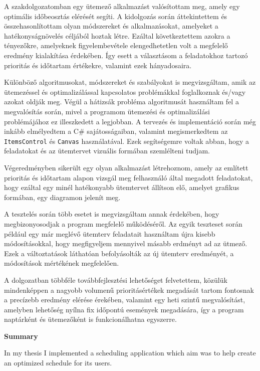 
A szakdolgozatomban egy ütemező alkalmazást valósítottam meg, amely egy optimális időbeosztás elérését segíti. A kidolgozás során áttekintettem és összehasonlítottam olyan módszereket és alkalmazásokat, amelyeket a hatékonyságnövelés céljából hoztak létre. Ezáltal következtettem azokra a tényezőkre, amelyeknek figyelembevétele elengedhetetlen volt a megfelelő eredmény kialakítása érdekében. Így esett a választásom a feladatokhoz tartozó prioritás és időtartam értékekre, valamint ezek hányadosaira.

Különböző algoritmusokat, módszereket és szabályokat is megvizsgáltam, amik az ütemezéssel és optimalizálással kapcsolatos problémákkal foglalkoznak és/vagy azokat oldják meg. Végül a hátizsák probléma algoritmusát használtam fel a megvalósítás során, mivel a programom ütemezési és optimalizálási problémájához ez illeszkedett a legjobban.
A tervezés és implementáció során még inkább elmélyedtem a C\# sajátosságaiban, valamint megismerkedtem az \texttt{ItemsControl} és \texttt{Canvas} használatával. Ezek segítségemre voltak abban, hogy a feladatokat és az ütemtervet vizuális formában szemlélteni tudjam.

Végeredményben sikerült egy olyan alkalmazást létrehoznom, amely az említett prioritás és időtartam alapon vizsgál meg felhasználó által megadott feladatokat, hogy ezáltal egy minél hatékonyabb ütemtervet állítson elő, amelyet grafikus formában, egy diagramon jelenít meg.

A tesztelés során több esetet is megvizsgáltam annak érdekében, hogy megbizonyosodjak a program megfelelő működéséről. Az egyik teszteset során például egy már meglévő ütemterv feladatait használtam újra kisebb módosításokkal, hogy megfigyeljem mennyivel másabb erdményt ad az ütmező. Ezek a változtatások láthatóan befolyásolták az új ütemterv eredményét, a módosítások mértékének megfelelően.

A dolgozatban többféle továbbfejlesztési lehetőséget felvetettem, közülük mindenképpen a nagyobb volumenű prioritásértékek megadását tartom fontosnak a precízebb eredmény elérése érekében, valamint egy heti szintű megvalósítást, amelyben lehetőség nyílna fix időpontú események megadására, így a program naptárként és ütemezőként is funkcionálhatna egyszerre.

\newpage
\begin{LARGE}
\textbf{Summary}
\end{LARGE}
\vskip 1cm

In my thesis I implemented a scheduling application which aim was to help create an optimized schedule for its users.

